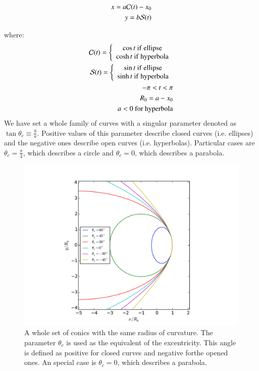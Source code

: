 \begin{align}
x = a\mathcal{C}(t)-x_0 \\ 
y = b\mathcal{S}(t)
\end{align}

where:
\begin{align}
\mathcal{C}(t) = \left\lbrace \begin{array}{c}
\cos t ~\mathrm{if~ellipse} \\
\cosh t ~\mathrm{if~hyperbola}
\end{array}\right.\\
\mathcal{S}(t) = \left\lbrace \begin{array}{c}
\sin t ~\mathrm{if~ellipse} \\
\sinh t ~\mathrm{if~hyperbola}
\end{array}\right. \\
-\pi < t < \pi \\
R_0 = a - x_0 \\
a<0 ~ \mathrm{for~hyperbola}
\end{align}
We have set a whole family of curves with a singular parameter denoted as $\tan\theta_c \equiv \frac{b}{a}$. Positive values of this parameter describe closed curves
(i.e. ellipses) and the negative ones describe open curves (i.e. hyperbolas). Particular cases are $\theta_c =\frac{\pi}{4}$, which describes a circle and $\theta_c=0$, which describes
a parabola.
\begin{figure}
\includegraphics[width=\linewidth]{conic1}
\caption{A whole set of conics with the same radius of curvature. The parameter $\theta_c$ is used as the equivalent of the excentricity. This angle is defined as positive for closed curves
and negative forthe opened ones. An special case is $\theta_c=0$, which describes a parabola.}
\label{fig:conics-family}
\end{figure}

